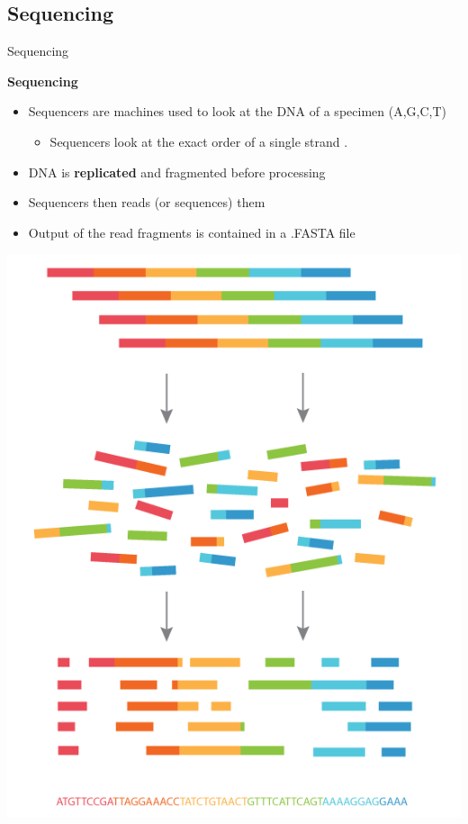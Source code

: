 \documentclass{beamer}
\begin{document}
    \subsection{Sequencing}
    \begin{frame}{Sequencing}

        \textbf{Sequencing}
    \begin{itemize}
        \item Sequencers are machines used to look at the DNA of a specimen (A,G,C,T)
        \begin{itemize}
            \item Sequencers look at the exact order of a single strand \cite{genomics-definition}. 
        \end{itemize}
        \item DNA is \textbf{replicated} and fragmented before processing
        \item Sequencers then reads (or sequences) them
        \item Output of the read fragments is contained in a .FASTA file
    \end{itemize}
            \centering
        \includegraphics[scale=0.2]{sequencing.png}
    \end{frame}
    
\end{document}
